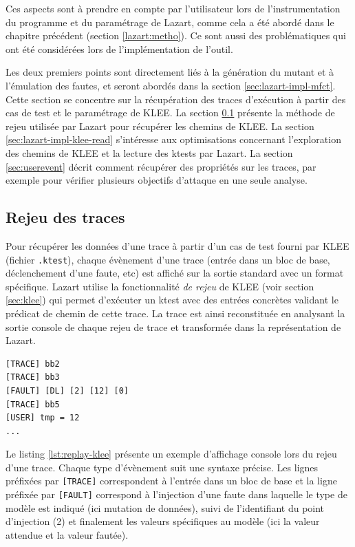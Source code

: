         Ces aspects sont à prendre en compte par l'utilisateur lors de l'instrumentation du programme et du paramétrage de Lazart, comme cela a été abordé dans le chapitre précédent (section \ref{lazart:metho}). 
        Ce sont aussi des problématiques qui ont été considérées lors de l'implémentation de l'outil.
        
        Les deux premiers points sont directement liés à la génération du mutant et à l'émulation des fautes, et seront abordés dans la section \ref{sec:lazart-impl-mfct}. Cette section se concentre sur la récupération des traces d'exécution à partir des cas de test et le paramétrage de KLEE.
        La section \ref{sec:lazart-impl-klee-replay} présente la méthode de rejeu utilisée par Lazart pour récupérer les chemins de KLEE.
        La section \ref{sec:lazart-impl-klee-read} s'intéresse aux optimisations concernant l'exploration des chemins de KLEE et la lecture des ktests par Lazart. 
        La section \ref{sec:userevent} décrit comment récupérer des propriétés sur les traces, par exemple pour vérifier plusieurs objectifs d'attaque en une seule analyse.
    
        \subsection{Rejeu des traces}
        \label{sec:lazart-impl-klee-replay}
 	
            Pour récupérer les données d'une trace à partir d'un cas de test fourni par KLEE (fichier \texttt{.ktest}), chaque évènement d'une trace (entrée dans un bloc de base, déclenchement d'une faute, etc) est affiché sur la sortie standard avec un format spécifique.
            Lazart utilise la fonctionnalité \textit{de rejeu} de KLEE (voir section \ref{sec:klee}) qui permet d'exécuter un ktest avec des entrées concrètes validant le prédicat de chemin de cette trace. La trace est ainsi reconstituée en analysant la sortie console de chaque rejeu de trace et transformée dans la représentation de Lazart.
            
\begin{lstlisting}  
[TRACE] bb2
[TRACE] bb3
[FAULT] [DL] [2] [12] [0]
[TRACE] bb5
[USER] tmp = 12
...
\end{lstlisting} 

            Le listing \ref{lst:replay-klee} présente un exemple d'affichage console lors du rejeu d'une trace. 
            Chaque type d'évènement suit une syntaxe précise. Les lignes préfixées par \texttt{[TRACE]} correspondent à l'entrée dans un bloc de base et la ligne préfixée par \texttt{[FAULT]} correspond à l'injection d'une faute dans laquelle le type de modèle est indiqué (ici mutation de données), suivi de l'identifiant du point d'injection (2) et finalement les valeurs spécifiques au modèle (ici la valeur attendue et la valeur fautée).
            

